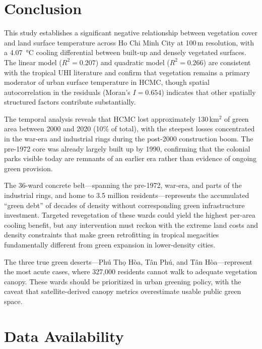 \documentclass[preprint,12pt]{elsarticle}
\begin{document}
\section{Conclusion}
\label{sec:conclusion}

This study establishes a significant negative relationship between vegetation cover and land surface temperature across Ho Chi Minh City at 100\,m resolution, with a \SI{4.07}{\degreeCelsius} cooling differential between built-up and densely vegetated surfaces. The linear model ($R^2 = 0.207$) and quadratic model ($R^2 = 0.266$) are consistent with the tropical UHI literature and confirm that vegetation remains a primary moderator of urban surface temperature in HCMC, though spatial autocorrelation in the residuals (Moran's $I = 0.654$) indicates that other spatially structured factors contribute substantially.

The temporal analysis reveals that HCMC lost approximately 130\,km$^2$ of green area between 2000 and 2020 (10\% of total), with the steepest losses concentrated in the war-era and industrial rings during the post-2000 construction boom. The pre-1972 core was already largely built up by 1990, confirming that the colonial parks visible today are remnants of an earlier era rather than evidence of ongoing green provision.

The 36-ward concrete belt---spanning the pre-1972, war-era, and parts of the industrial rings, and home to 3.5 million residents---represents the accumulated ``green debt'' of decades of density without corresponding green infrastructure investment. Targeted revegetation of these wards could yield the highest per-area cooling benefit, but any intervention must reckon with the extreme land costs and density constraints that make green retrofitting in tropical megacities fundamentally different from green expansion in lower-density cities.

The three true green deserts---Phú Thọ Hòa, Tân Phú, and Tân Hòa---represent the most acute cases, where 327,000 residents cannot walk to adequate vegetation canopy. These wards should be prioritized in urban greening policy, with the caveat that satellite-derived canopy metrics overestimate usable public green space.

\section*{Data Availability}
\end{document}
